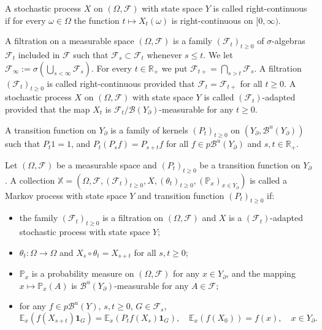 \documentclass[11pt,a4paper,reqno]{amsart}
\theoremstyle{definition}
\numberwithin{equation}{section}
\begin{document}
A stochastic process $X$ on $(\Omega, \mathcal{F})$ with state space $Y$
 is called right-continuous if for every $\omega \in \Omega$ the function 
 $t \longmapsto X_t(\omega)$ is right-continuous on $[0, \infty)$.
 
 A filtration on a measurable space $(\Omega, \mathcal{F})$  is a family 
 $\left(\mathcal{F}_t\right)_{t \geq 0}$ of $\sigma$-algebras $\mathcal{F}_t$
 included in  $\mathcal{F}$ such that $\mathcal{F}_s \subset \mathcal{F}_t$ whenever  $s\le t$. 
 We let  $\mathcal{F}_{\infty}:=\sigma(\bigcup_{s<\infty} \mathcal{F}_s)$. 
For every $t \in \mathbb{R}_{+}$ we put $\mathcal{F}_{t+}=\bigcap_{s>t} \mathcal{F}_s$. 
A  filtration $\left(\mathcal{F}_t\right)_{t \geq 0}$ 
is called right-continuous provided that $\mathcal{F}_t=\mathcal{F}_{t+}$ for all $t \geq 0$.
A  stochastic process $X$ on $(\Omega, \mathcal{F})$
with state space $Y$ is called $\left(\mathcal{F}_t\right)$-adapted 
provided that the map $X_t$ is $\mathcal{F}_t / \mathcal{B}(Y_\partial)$-measurable for any  $t \geq 0$. 

A transition function on $Y_\partial$ is a family of kernels $(P_t)_{t \geq 0}$
on $(Y_\partial, \mathcal{B}^u(Y_\partial))$ 
such that $P_t1= 1$, and  $P_t(P_s f)=P_{s+t} f$
for all $f \in p \mathcal{B}^u(Y_\partial)$ and $s, t \in \mathbb{R}_{+}$. 

Let $(\Omega, \mathcal{F})$ be a measurable space and   $\left(P_t\right)_{t \geq 0}$
be a transition function on $Y_\partial$.  
A collection $\mathbb X=\left( \Omega, \mathcal{F}, (\mathcal{F}_t)_{t\ge 0},X, (\theta_t)_{t\ge 0}, 
(\mathbb P_x)_{x\in Y_\partial}\right)$
 is called a Markov process with state space $Y$ and  transition function $\left(P_t\right)_{t \geq 0}$ if:
 \begin{itemize}
\item[(i)] the family $\left(\mathcal{F}_t\right)_{t \geq 0}$ is a filtration on 
$(\Omega, \mathcal{F})$ and  $X$ is a $\left(\mathcal{F}_t\right)$-adapted
stochastic  process with state space $Y$;
\item[(ii)]$\theta_t:  \Omega \longrightarrow  \Omega$ 
and $X_s \circ \theta_t=X_{s+t}$ for all $s,t\ge 0$;
\item[(iii)] $\mathbb P_x$ is a probability measure on $(\Omega, \mathcal{F})$ for any $x \in Y_\partial$, and 
the mapping   $x \longmapsto \mathbb P_x(A)$ is $\mathcal{B}^u(Y_\partial)$-measurable for any  $A \in  \mathcal{F}$;
\item[(iv)]
for any $f\in p \mathcal{B}^u(Y)$, $s, t \geq 0$, $G \in \mathcal{F}_s$,
\[
\mathbb E_x\left(f(X_{s+t}) \mathbf 1_G\right)= 
\mathbb E_x\left(P_t f(X_s) \mathbf 1_G\right),\quad \mathbb E_x\left(f(X_0)\right)=f(x),\quad x \in Y_\partial.
\] 
\end{itemize}
\end{document}
